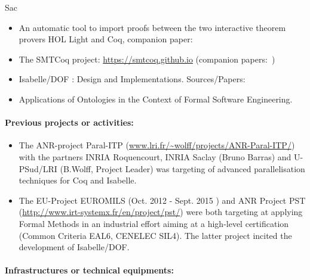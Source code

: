\begin{sitedescription}{Sac}

\begin{itemize}
\item An automatic tool to import proofs between the two interactive
  theorem provers HOL Light and Coq, companion
  paper:~\cite{DBLP:conf/itp/KellerW10}
\item The SMTCoq project: \url{https://smtcoq.github.io} (companion
  papers:~\cite{DBLP:conf/cpp/ArmandFGKTW11,DBLP:conf/cav/EkiciMTKKRB17})
\item Isabelle/DOF : Design and Implementations.
 Sources/Papers: \cite{brucker_achim_d_2019_3370483,brucker.ea:isabelle-ontologies:2018}
\item Applications of Ontologies in the Context of Formal Software Engineering.
 \cite{brucker.ea:ontologies-certification:2019}
\end{itemize}

\paragraph{Previous projects or activities:}


\begin{itemize}
\item The ANR-project Paral-ITP (\url{www.lri.fr/~wolff/projects/ANR-Paral-ITP/}) with the  
      partners INRIA Roquencourt, INRIA Saclay (Bruno Barras) 
      and U-PSud/LRI (B.Wolff, Project Leader) was targeting 
      of advanced parallelisation techniques for Coq and Isabelle.
\item The EU-Project EUROMILS (Oct. 2012 - Sept. 2015 ) and 
      ANR Project PST (\url{http://www.irt-systemx.fr/en/project/pst/})
      were both targeting at applying Formal Methods in an industrial
      effort aiming at a high-level certification (Common Criteria EAL6, 
      CENELEC SIL4). The latter project incited the development of 
      Isabelle/DOF\cite{brucker_achim_d_2019_3370483}.
\end{itemize} 

\paragraph{Infrastructures or technical equipments:}


\end{sitedescription}
